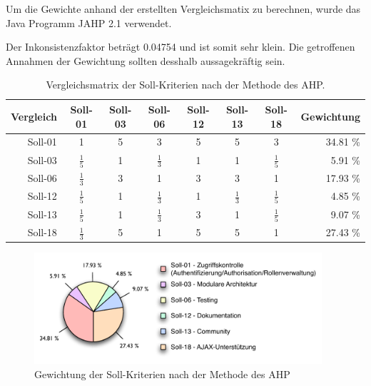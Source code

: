   Um die Gewichte anhand der erstellten Vergleichsmatix zu berechnen, wurde das
  Java Programm JAHP 2.1 verwendet.
  
  Der Inkonsistenzfaktor beträgt 0.04754 und ist somit sehr klein. Die
  getroffenen Annahmen der Gewichtung sollten desshalb aussagekräftig sein.
  \newline
  
  \begin{table}[!h]
    \sffamily 
    \begin{center}
      \begin{tabular}{r|cccccc|r}
        \toprule
        Vergleich & Soll-01 & Soll-03 & Soll-06 & Soll-12 & Soll-13 & Soll-18
        & Gewichtung\\
        \midrule
        Soll-01 & 1 & 5 & 3 & 5 & 5 & 3 & 34.81 \%\\
        Soll-03 & $\frac{1}{5}$ & 1 & $\frac{1}{3}$ & 1 & 1 & $\frac{1}{5}$ &
        5.91 \%\\
        Soll-06 & $\frac{1}{3}$ & 3 & 1 & 3 & 3 & 1 & 17.93 \%\\
        Soll-12 & $\frac{1}{5}$ & 1 & $\frac{1}{3}$ & 1 & $\frac{1}{3}$ &
        $\frac{1}{5}$ & 4.85 \% \\
        Soll-13 & $\frac{1}{5}$ & 1 & $\frac{1}{3}$ & 3 & 1 & $\frac{1}{5}$ &
        9.07 \%\\ Soll-18 & $\frac{1}{3}$ & 5 & 1 & 5 & 5 & 1 & 27.43 \%\\
        \bottomrule
      \end{tabular}
      \caption{Vergleichsmatrix der Soll-Kriterien nach der Methode des AHP.}
      \label{tab:gewichtungDerSollKriterien}
    \end{center}
  \end{table}
  
  \begin{figure}[ht]
    \begin{center}
      \includegraphics[width=0.95\textwidth]{./image/gewichtungSollKriterien.pdf}
      \caption{Gewichtung der Soll-Kriterien nach der Methode des AHP}
      \label{img:gewichtungSollKriterien}
    \end{center}
  \end{figure}
  
